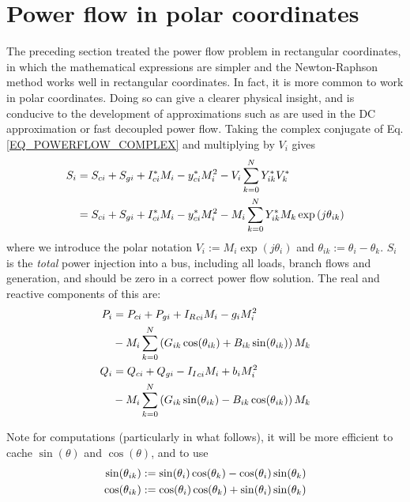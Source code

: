 \documentclass[11pt]{article}
\newcommand{\Ir}{{I_R}}
\newcommand{\Ii}{{I_I}}
\begin{document}
\section{Power flow in polar coordinates}
The preceding section treated the power flow problem in rectangular coordinates, in which the mathematical expressions are simpler and the Newton-Raphson method works well in rectangular coordinates. In fact, it is more common to work in polar coordinates. Doing so can give a clearer physical insight, and is conducive to the development of approximations such as are used in the DC approximation or fast decoupled power flow. Taking the complex conjugate of Eq. \ref{EQ_POWERFLOW_COMPLEX} and multiplying by $V_i$ gives
\newcommand{\M}[1]{\ensuremath{M_{#1}}}
\newcommand{\cs}[1]{\ensuremath{\cos(\theta_{#1})}}
\newcommand{\sn}[1]{\ensuremath{\sin(\theta_{#1})}}
\newcommand{\sm}[1]{\ensuremath{\sum_{k = 0}^N{#1}}}
\begin{align}
	S_i &= S_{ci} + S_{gi} + I^*_{ci}M_i - y^*_{ci}\M{i}^2 - V_i\sm{Y^*_{ik}V^*_k} \notag \\
	&= S_{ci} + S_{gi} + I^*_{ci}M_i - y^*_{ci}\M{i}^2 - \M{i}\sm{Y^*_{ik}\M{k}\exp{(j\theta_{ik})}}
\end{align}
where we introduce the polar notation $V_i := M_i \exp{(j\theta_i)}$ and $\theta_{ik} := \theta_i - \theta_k$. $S_i$ is the \emph{total} power injection into a bus, including all loads, branch flows and generation, and should be zero in a correct power flow solution. The real and reactive components of this are:
\begin{align}
	P_i &= P_{ci} + P_{gi} + \Ir_{ci}M_i - g_i\M{i}^2 \notag \\
	&- \M{i}\sm{\left(G_{ik}\cs{ik} + B_{ik}\sn{ik}\right)\M{k}} \notag \\
	Q_i &= Q_{ci} + Q_{gi} - \Ii_{ci}M_i + b_i\M{i}^2 \notag \\
	&- \M{i}\sm{\left(G_{ik}\sn{ik} - B_{ik}\cs{ik}\right)\M{k}} \notag \\
\end{align}

Note for computations (particularly in what follows), it will be more efficient to cache $\sin(\theta)$ and $\cos(\theta)$, and to use
\begin{align}
	\sin(\theta_{ik}) &:= \sin(\theta_i)\cos(\theta_k) - \cos(\theta_i)\sin(\theta_k) \notag \\
	\cos(\theta_{ik}) &:= \cos(\theta_i)\cos(\theta_k) + \sin(\theta_i)\sin(\theta_k)
\end{align}
\end{document}
